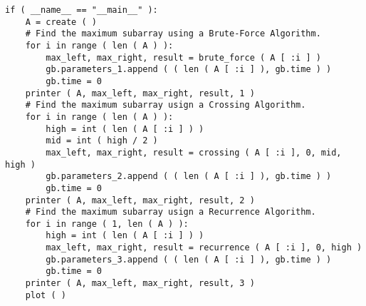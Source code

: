 \begin{lstlisting}
if ( __name__ == "__main__" ):
    A = create ( )
    # Find the maximum subarray using a Brute-Force Algorithm.
    for i in range ( len ( A ) ):
        max_left, max_right, result = brute_force ( A [ :i ] )
        gb.parameters_1.append ( ( len ( A [ :i ] ), gb.time ) )
        gb.time = 0
    printer ( A, max_left, max_right, result, 1 )
    # Find the maximum subarray usign a Crossing Algorithm.
    for i in range ( len ( A ) ):
        high = int ( len ( A [ :i ] ) )
        mid = int ( high / 2 )
        max_left, max_right, result = crossing ( A [ :i ], 0, mid, high )
        gb.parameters_2.append ( ( len ( A [ :i ] ), gb.time ) )
        gb.time = 0
    printer ( A, max_left, max_right, result, 2 )
    # Find the maximum subarray usign a Recurrence Algorithm.
    for i in range ( 1, len ( A ) ):
        high = int ( len ( A [ :i ] ) )
        max_left, max_right, result = recurrence ( A [ :i ], 0, high )
        gb.parameters_3.append ( ( len ( A [ :i ] ), gb.time ) )
        gb.time = 0
    printer ( A, max_left, max_right, result, 3 )
    plot ( )
\end{lstlisting}

\pagebreak

